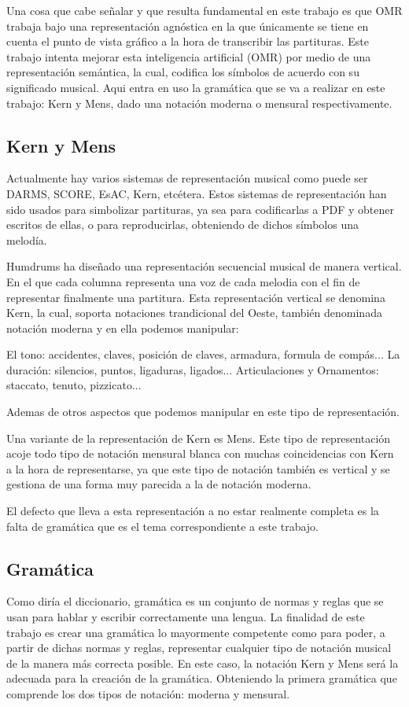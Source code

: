 \documentclass{article}
\begin{document}
Una cosa que cabe señalar y que resulta fundamental en este trabajo es que OMR trabaja bajo una representación agnóstica en la que
únicamente se tiene en cuenta el punto de vista gráfico a la hora de transcribir las partituras. Este trabajo intenta mejorar esta
inteligencia artificial (OMR) por medio de una representación semántica, la cual, codifica los símbolos de acuerdo con su significado
musical. Aqui entra en uso la gramática que se va a realizar en este trabajo: Kern y Mens, dado una notación moderna o mensural respectivamente.

\subsection{Kern y Mens}
 Actualmente hay varios sistemas de representación musical como puede ser DARMS, SCORE, EsAC, Kern, etcétera. Estos sistemas
de representación han sido usados para simbolizar partituras, ya sea para codificarlas a PDF y obtener escritos de ellas, o para
reproducirlas, obteniendo de dichos símbolos una melodía.

Humdrums ha diseñado una representación secuencial musical de manera vertical. En el que cada columna representa una voz de cada melodia
con el fin de representar finalmente una partitura. Esta representación vertical se denomina Kern, la cual, soporta notaciones trandicional del Oeste,
también denominada notación moderna y en ella podemos manipular:

    El tono: accidentes, claves, posición de claves, armadura, formula de compás...
    La duración: silencios, puntos, ligaduras, ligados...
    Articulaciones y Ornamentos: staccato, tenuto, pizzicato...

Ademas de otros aspectos que podemos manipular en este tipo de representación.

 Una variante de la representación de Kern es Mens. Este tipo de representación acoje todo tipo de notación mensural blanca
con muchas coincidencias con Kern a la hora de representarse, ya que este tipo de notación también es vertical y se gestiona
de una forma muy parecida a la de notación moderna.

El defecto que lleva a esta representación a no estar realmente completa es la falta de gramática que es el tema correspondiente
a este trabajo.

\subsection{Gramática}
    Como diría el diccionario, gramática es un conjunto de normas y reglas que se usan para hablar y escribir correctamente una lengua.
La finalidad de este trabajo es crear una gramática lo mayormente competente como para poder, a partir de dichas normas y reglas, representar
cualquier tipo de notación musical de la manera más correcta posible. En este caso, la notación Kern y Mens será la adecuada para la creación
de la gramática.
    Obteniendo la primera gramática que comprende los dos tipos de notación: moderna y mensural.
\end{document}
